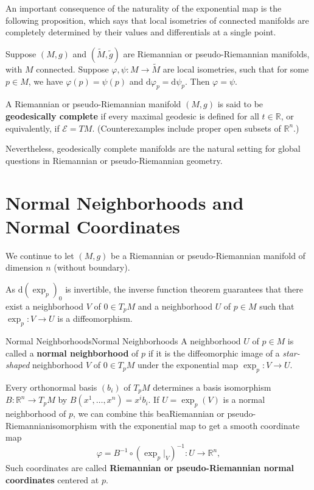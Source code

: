 \documentclass[../main.tex]{subfiles}
\begin{document}
An important consequence of the naturality of the exponential map is the following proposition, which says that local isometries of connected manifolds are completely determined by their values and differentials at a single point.

\begin{proposition}{}{}
	Suppose $(M, g)$ and $(\tilde{M}, \tilde{g})$ are Riemannian or pseudo-Riemannian manifolds, with $M$ connected. Suppose $\varphi, \psi: M \to \tilde{M}$ are local isometries, such that for some $p \in M$, we have $\varphi(p) = \psi(p)$ and $\mathrm{d} \varphi_p = \mathrm{d} \psi_p$. Then $\varphi = \psi$.
\end{proposition}

A Riemannian or pseudo-Riemannian manifold $(M, g)$ is said to be \textbf{geodesically complete} if every maximal geodesic is defined for all $t \in \mathbb{R}$, or equivalently, if $\mathcal{E} = TM$. (Counterexamples include proper open subsets of $\mathbb{R}^n$.)

Nevertheless, geodesically complete manifolds are the natural setting for global questions in Riemannian or pseudo-Riemannian geometry.

\section{Normal Neighborhoods and Normal Coordinates}
We continue to let $(M, g)$ be a Riemannian or pseudo-Riemannian manifold of dimension $n$ (without boundary).

As $\mathrm{d} (\exp_p)_0$ is invertible, the inverse function theorem guarantees that there exist a neighborhood $V$ of $0 \in T_p M$ and a neighborhood $U$ of $p \in M$ such that $\exp_p: V \to U$ is a diffeomorphism.
\begin{definition}{Normal Neighborhoods}{Normal Neighborhoods}
	A neighborhood $U$ of $p \in M$ is called a \textbf{normal neighborhood} of $p$ if it is the diffeomorphic image of a \emph{star-shaped} neighborhood $V$ of $0 \in T_p M$ under the exponential map $\exp_p: V \to U$.
\end{definition}

Every orthonormal basis $(b_i)$ of $T_p M$ determines a basis isomorphism $B: \mathbb{R}^n \to T_p M$ by $B(x^1, \ldots, x^n) = x^i b_i$. If $U = \exp_p(V)$ is a normal neighborhood of $p$, we can combine this beaRiemannian or pseudo-Riemannianisomorphism with the exponential map to get a smooth coordinate map
\begin{equation}
	\varphi = B^{-1} \circ (\exp_p|_V)^{-1}: U \to \mathbb{R}^n,
\end{equation}
Such coordinates are called \textbf{Riemannian or pseudo-Riemannian normal coordinates} centered at $p$.
\end{document}
